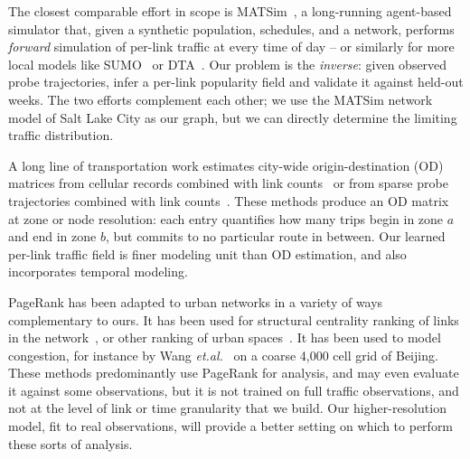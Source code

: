 \documentclass[sigconf, review]{acmart}
\begin{document}
The closest comparable effort in scope is
MATSim~\cite{horni2016matsim, balmer2006matsim}, a long-running
agent-based simulator that, given a synthetic population,
schedules, and a network, performs \emph{forward} simulation of
per-link traffic at every time of day -- or similarly for more local models like SUMO~\cite{SUMO} or DTA~\cite{wang2018dynamic}. Our problem is the
\emph{inverse}: given observed probe trajectories, infer a
per-link popularity field and validate it against held-out
weeks. The two efforts complement each other; we use
the MATSim network model of Salt Lake City as our graph, but we can directly determine the limiting traffic distribution.  

A long line of transportation work estimates city-wide
origin-destination (OD) matrices from cellular records combined
with link counts~\cite{iqbal2014odmatrices} or from sparse
probe trajectories combined with link
counts~\cite{yang2017odprobe}. These methods produce an OD
matrix at zone or node resolution: each entry quantifies how
many trips begin in zone $a$ and end in zone $b$, but commits
to no particular route in between. Our learned per-link traffic field
is finer modeling unit than OD estimation, and also incorporates temporal modeling.  

PageRank has been adapted to urban networks in a variety of ways complementary to ours.  
It has been used for structural centrality ranking of links in the network~\cite{agryzkov2023nonlocal}, or other ranking of urban spaces~\cite{jiang2009ranking}.   
It has been used to model congestion, for instance by Wang \emph{et.al.}~\cite{wang2017pagerank} on a coarse 4,000 cell grid of Beijing.  
These methods predominantly use PageRank for analysis, and may even evaluate it against some observations, but it is not trained on full traffic observations, and not at the level of link or time granularity that we build.  Our higher-resolution model, fit to real observations, will provide a better setting on which to perform these sorts of analysis.  
\end{document}
